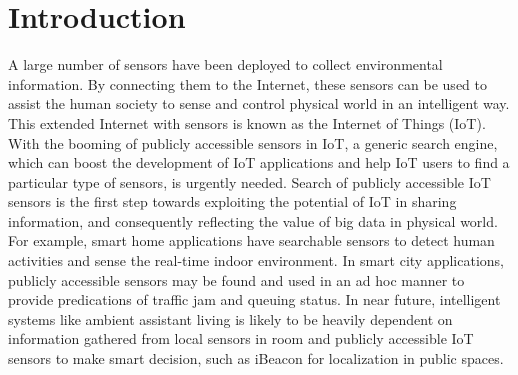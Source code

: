 \documentclass[conference]{IEEEtran}
\begin{document}
\IEEEpeerreviewmaketitle

\section{Introduction} \label{introduction}
A large number of sensors have been deployed to collect environmental information. 
By connecting them to the Internet, these sensors can be used to assist the human society to sense and control physical world in an intelligent way. 
This extended Internet with sensors is known as the Internet of Things (IoT). 
With the booming of publicly accessible sensors in IoT, a generic search engine, which can boost the development of IoT applications and  help IoT users to find a particular type of sensors, is urgently needed. 
Search of publicly accessible IoT sensors is the first step towards exploiting the potential of IoT in sharing information, and consequently reflecting the value of big data in physical world.
For example, smart home applications have searchable sensors to detect human activities and sense the real-time indoor environment. 
In smart city applications, publicly accessible sensors may be found and used in an ad hoc manner to provide predications of traffic jam and queuing status.
In near future, intelligent systems like ambient assistant living is likely to be heavily dependent on information gathered from local sensors in room and publicly accessible IoT sensors to make smart decision, such as iBeacon\cite{iBeacon} for localization in public spaces.
\end{document}
